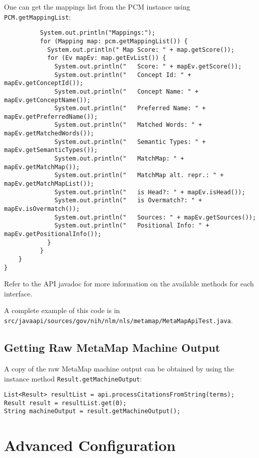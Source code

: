 \documentclass[11pt]{article}
\begin{document}
One can get the mappings list from the PCM instance using \texttt{PCM.getMappingList}:

\begin{verbatim}
          System.out.println("Mappings:");
          for (Mapping map: pcm.getMappingList()) {
            System.out.println(" Map Score: " + map.getScore());
            for (Ev mapEv: map.getEvList()) {
              System.out.println("   Score: " + mapEv.getScore());
              System.out.println("   Concept Id: " + mapEv.getConceptId());
              System.out.println("   Concept Name: " + mapEv.getConceptName());
              System.out.println("   Preferred Name: " + mapEv.getPreferredName());
              System.out.println("   Matched Words: " + mapEv.getMatchedWords());
              System.out.println("   Semantic Types: " + mapEv.getSemanticTypes());
              System.out.println("   MatchMap: " + mapEv.getMatchMap());
              System.out.println("   MatchMap alt. repr.: " + mapEv.getMatchMapList());
              System.out.println("   is Head?: " + mapEv.isHead());
              System.out.println("   is Overmatch?: " + mapEv.isOvermatch());
              System.out.println("   Sources: " + mapEv.getSources());
              System.out.println("   Positional Info: " + mapEv.getPositionalInfo());
            }
          }
    }
}
\end{verbatim}

Refer to the API javadoc for more information on the available methods
for each interface.


A complete example of this code is in
\texttt{src/javaapi/sources/gov/nih/nlm/nls/metamap/MetaMapApiTest.java}.




\subsection{Getting Raw MetaMap Machine Output}
\label{Getting Raw MetaMap Machine Output}

A copy of the raw MetaMap machine output can be obtained by using the
instance method \texttt{Result.getMachineOutput}:

\begin{verbatim}
List<Result> resultList = api.processCitationsFromString(terms);
Result result = resultList.get(0);
String machineOutput = result.getMachineOutput();
\end{verbatim}



\section{Advanced Configuration}
\label{Advanced Configuration}
\end{document}
